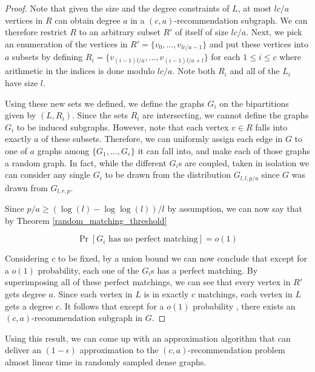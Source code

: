 \begin{proof}
Note that given the size and the degree constraints of $L$, at most $lc/a$
vertices in $R$ can obtain degree $a$ in a $(c,a)$-recommendation subgraph. We
can therefore restrict $R$ to an arbitrary subset $R'$ of itself of size $lc/a$.
Next, we pick an enumeration of the vertices in $R'=\{v_0,\ldots, v_{lc/a-1}\}$
and put these vertices into $a$ subsets by defining
$R_i = \{v_{(i-1)l/a}, \ldots, v_{(i-1)l/a+l}\}$ for each $1\leq i\leq c$ where
arithmetic in the indices is done modulo $lc/a$. Note both $R_i$ and all of the
$L_i$ have size $l$. \vs

Using these new sets we defined, we define the graphs $G_i$ on the bipartitions
given by $(L, R_i)$. Since the sets $R_i$ are intersecting, we cannot define the
graphs $G_i$ to be induced subgraphs. However, note that each vertex $v\in R$
falls into exactly $a$ of these subsets. Therefore, we can uniformly assign each
edge in $G$ to one of $a$ graphs among $\{G_1,\ldots, G_c\}$ it can fall into,
and make each of those graphs a random graph. In fact, while the different
$G_i$s are coupled, taken in isolation we can consider any single $G_i$ to be
drawn from the distribution $G_{l,l,p/a}$ since $G$ was drawn from $G_{l,r,p}$.
\vs

Since $p/a \geq (\log(l)-\log\log(l))/l$ by assumption, we can now say that by
Theorem \ref{random_matching_threshold} 

\[ \Pr[\text{$G_i$ has no perfect matching}] = o(1) \]

Considering $c$ to be fixed, by a union bound we can now conclude that except
for a $o(1)$ probability, each one of the $G_i$s has a perfect matching. By
superimposing all of these perfect matchings, we can see that every vertex in
$R'$ gets degree $a$. Since each vertex in $L$ is in exactly $c$ matchings, each
vertex in $L$ gets a degree $c$. It follows that except for a $o(1)$ probability
, there exists an $(c,a)$-recommendation subgraph in $G$.
\end{proof}

Using this result, we can come up with an approximation algorithm that can
deliver an $(1-\epsilon)$ approximation to the $(c,a)$-recommendation problem
almost linear time in randomly sampled dense graphs.

